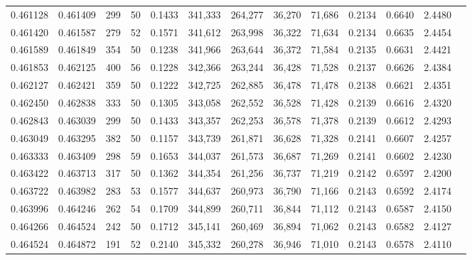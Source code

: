 \begin{tabular}{rrrrrrrrrrrrr}
0.461128 & 0.461409 &    299 &    50 &                                     0.1433 & 341,333 & 264,277 &  36,270 &  71,686 & 0.2134 & 0.6640 & 2.4480 \\
0.461420 & 0.461587 &    279 &    52 &                                     0.1571 & 341,612 & 263,998 &  36,322 &  71,634 & 0.2134 & 0.6635 & 2.4454 \\
0.461589 & 0.461849 &    354 &    50 &                                     0.1238 & 341,966 & 263,644 &  36,372 &  71,584 & 0.2135 & 0.6631 & 2.4421 \\
0.461853 & 0.462125 &    400 &    56 &                                     0.1228 & 342,366 & 263,244 &  36,428 &  71,528 & 0.2137 & 0.6626 & 2.4384 \\
0.462127 & 0.462421 &    359 &    50 &                                     0.1222 & 342,725 & 262,885 &  36,478 &  71,478 & 0.2138 & 0.6621 & 2.4351 \\
0.462450 & 0.462838 &    333 &    50 &                                     0.1305 & 343,058 & 262,552 &  36,528 &  71,428 & 0.2139 & 0.6616 & 2.4320 \\
0.462843 & 0.463039 &    299 &    50 &                                     0.1433 & 343,357 & 262,253 &  36,578 &  71,378 & 0.2139 & 0.6612 & 2.4293 \\
0.463049 & 0.463295 &    382 &    50 &                                     0.1157 & 343,739 & 261,871 &  36,628 &  71,328 & 0.2141 & 0.6607 & 2.4257 \\
0.463333 & 0.463409 &    298 &    59 &                                     0.1653 & 344,037 & 261,573 &  36,687 &  71,269 & 0.2141 & 0.6602 & 2.4230 \\
0.463422 & 0.463713 &    317 &    50 &                                     0.1362 & 344,354 & 261,256 &  36,737 &  71,219 & 0.2142 & 0.6597 & 2.4200 \\
0.463722 & 0.463982 &    283 &    53 &                                     0.1577 & 344,637 & 260,973 &  36,790 &  71,166 & 0.2143 & 0.6592 & 2.4174 \\
0.463996 & 0.464246 &    262 &    54 &                                     0.1709 & 344,899 & 260,711 &  36,844 &  71,112 & 0.2143 & 0.6587 & 2.4150 \\
0.464266 & 0.464524 &    242 &    50 &                                     0.1712 & 345,141 & 260,469 &  36,894 &  71,062 & 0.2143 & 0.6582 & 2.4127 \\
0.464524 & 0.464872 &    191 &    52 &                                     0.2140 & 345,332 & 260,278 &  36,946 &  71,010 & 0.2143 & 0.6578 & 2.4110 \\

\end{tabular}
